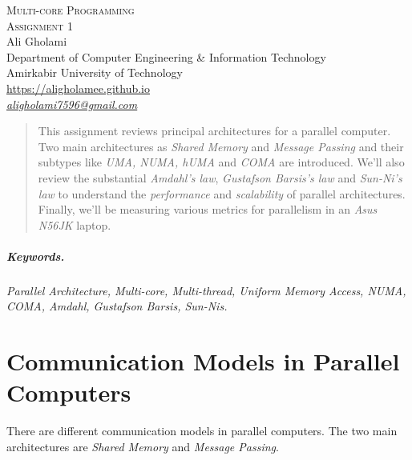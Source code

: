 \documentclass[12pt]{article}
\numberwithin{equation}{section}
\numberwithin{table}{section}
\numberwithin{figure}{section}
\begin{document}

\begin{center}
\textsc{\Large Multi-core Programming} \\[2pt]
	\textsc{\large Assignment 1}\\
	\vspace{0.5cm}
  Ali Gholami \\[6pt]
  Department of Computer Engineering \& Information Technology\\
  Amirkabir University of Technology  \\[6pt]
  \def\UrlFont{\em}
  \url{https://aligholamee.github.io}\\
    \href{mailto:aligholami7596@gmail.com}{\textit{aligholami7596@gmail.com}}
\end{center}

\begin{abstract}
This assignment reviews principal architectures for a parallel computer. Two main architectures as \textit{Shared Memory} and \textit{Message Passing} and their subtypes like \textit{UMA, NUMA, hUMA} and \textit{COMA} are introduced. We'll also review the substantial \textit{Amdahl's law}, \textit{Gustafson Barsis's law} and \textit{Sun-Ni’s law} to understand the \textit{performance} and \textit{scalability} of parallel architectures. Finally, we'll be measuring various metrics for parallelism in an \textit{Asus N56JK} laptop.
\end{abstract}

\subparagraph{Keywords.} \textit{Parallel Architecture, Multi-core, Multi-thread, Uniform Memory Access, NUMA, COMA, Amdahl, Gustafson Barsis, Sun-Nis.}

\section{Communication Models in Parallel Computers}
There are different communication models in parallel computers. The two main architectures are \textit{Shared Memory} and \textit{Message Passing}.
\end{document}
